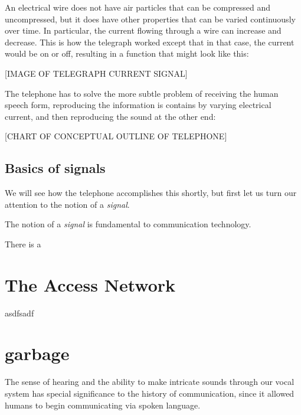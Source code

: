 \documentclass[UTF8]{book}
\begin{document}
\begin{CJK}{UTF8}{gbsn}
An electrical wire does not have air particles that can be compressed and uncompressed, but it does have other properties that can be varied continuously over time. In particular, the current flowing through a wire can increase and decrease. This is how the telegraph worked except that in that case, the current would be on or off, resulting in a function that might look like this:

[IMAGE OF TELEGRAPH CURRENT SIGNAL]

The telephone has to solve the more subtle problem of receiving the human speech form, reproducing the information is contains by varying electrical current, and then reproducing the sound at the other end:

[CHART OF CONCEPTUAL OUTLINE OF TELEPHONE]

\section{Basics of signals}

We will see how the telephone accomplishes this shortly, but first let us turn our attention to the notion of a \emph{signal}.




The notion of a \emph{signal} is fundamental to communication technology.

There is a












\chapter{The Access Network}

asdfsadf


\chapter{garbage}

The sense of hearing and the ability to make intricate sounds through our vocal system has special significance to the history of communication, since it allowed humans to begin communicating via spoken language.

\end{CJK}
\end{document}
